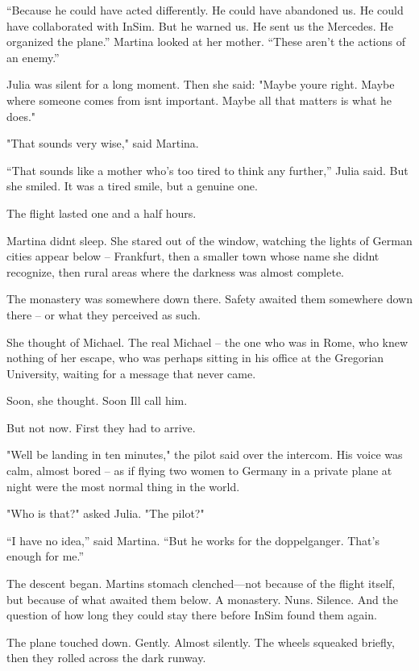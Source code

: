 \documentclass[
]{article}
\begin{document}
``Because he could have acted differently. He could have abandoned us. He could have collaborated with InSim. But he warned us. He sent us the Mercedes. He organized the plane.'' Martina looked at her mother. ``These aren't the actions of an enemy.''

Julia was silent for a long moment. Then she said: "Maybe you\textquotesingle re right. Maybe where someone comes from isn\textquotesingle t important. Maybe all that matters is what he does."

"That sounds very wise," said Martina.

``That sounds like a mother who's too tired to think any further,'' Julia said. But she smiled. It was a tired smile, but a genuine one.

The flight lasted one and a half hours.

Martina didn\textquotesingle t sleep. She stared out of the window, watching the lights of German cities appear below -- Frankfurt, then a smaller town whose name she didn\textquotesingle t recognize, then rural areas where the darkness was almost complete.

The monastery was somewhere down there. Safety awaited them somewhere down there -- or what they perceived as such.

She thought of Michael. The real Michael -- the one who was in Rome, who knew nothing of her escape, who was perhaps sitting in his office at the Gregorian University, waiting for a message that never came.

Soon, she thought. Soon I\textquotesingle ll call him.

But not now. First they had to arrive.

"We\textquotesingle ll be landing in ten minutes," the pilot said over the intercom. His voice was calm, almost bored -- as if flying two women to Germany in a private plane at night were the most normal thing in the world.

"Who is that?" asked Julia. "The pilot?"

``I have no idea,'' said Martina. ``But he works for the doppelganger. That's enough for me.''

The descent began. Martin\textquotesingle s stomach clenched---not because of the flight itself, but because of what awaited them below. A monastery. Nuns. Silence. And the question of how long they could stay there before InSim found them again.

The plane touched down. Gently. Almost silently. The wheels squeaked briefly, then they rolled across the dark runway.
\end{document}
